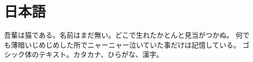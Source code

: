 \documentclass{article}
\begin{document}
\section{日本語}
吾輩は猫である。名前はまだ無い。どこで生れたかとんと見当がつかぬ。
何でも薄暗いじめじめした所でニャーニャー泣いていた事だけは記憶している。
\textsf{ゴシック体のテキスト}。カタカナ、ひらがな、漢字。
\end{document}
